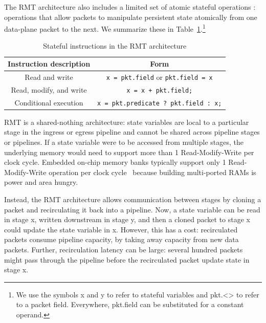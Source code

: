 The RMT architecture also includes a limited set of atomic stateful operations
: operations that allow packets to manipulate persistent state atomically from
one data-plane packet to the next.  We summarize these in
Table~\ref{t:stateful_inst}.\footnote{We use the symbols x and y to refer to
stateful variables and pkt.<> to refer to a packet field.  Everywhere,
pkt.field can be substituted for a constant operand.}
\begin{table}
\begin{small}
\begin{tabular}{|c|c|}
\hline
Instruction description & Form \\
\hline
Read and write & \texttt{x = pkt.field} or \texttt{pkt.field = x} \\
\hline
Read, modify, and write & \texttt{x = x + pkt.field;} \\
\hline
Conditional execution & \texttt{x = pkt.predicate ? pkt.field : x;} \\
\hline
\end{tabular}
\end{small}
\caption{Stateful instructions in the RMT architecture}
\label{t:stateful_inst}
\end{table}

RMT is a shared-nothing architecture: state variables are local to a particular
stage in the ingress or egress pipeline and cannot be shared across pipeline
stages or pipelines. If a state variable were to be accessed from multiple
stages, the underlying memory would need to support more than 1
Read-Modify-Write per clock cycle. Embedded on-chip memory banks typically
support only 1 Read-Modify-Write operation per clock
cycle~\cite{some_citation_from_memoir} because building multi-ported RAMs is
power and area hungry.

Instead, the RMT architecture allows communication between stages by cloning a
packet and recirculating it back into a pipeline. Now, a state variable can
be read in stage x, written downstream in stage y, and then a cloned packet to
stage x could update the state variable in x. However, this has a cost:
recirculated packets consume pipeline capacity, by taking away capacity from
new data packets. Further, recirculation latency can be large: several hundred
packets might pass through the pipeline before the recirculated packet update
state in stage x.


